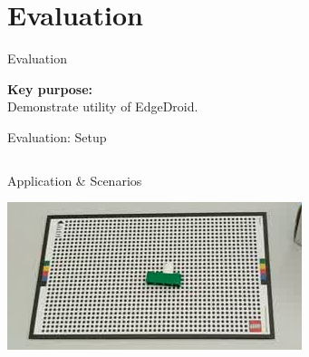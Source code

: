 \documentclass[aspectratio=1610, notes]{beamer}
\begin{document}
\section{Evaluation}
\begin{frame}{Evaluation}
    \begin{center}
        \Large%
        \textbf{Key purpose:}\\
        Demonstrate utility of EdgeDroid.\\
    \end{center}
\end{frame}

\begin{frame}{Evaluation: Setup}
    \begin{columns}[onlytextwidth]
        \begin{column}{.5\linewidth}
            \begin{block}{Application \& Scenarios}
                \begin{center}
                    \includegraphics[width=.7\linewidth]{img/lego/img3.jpeg}


\end{center}
\end{block}
\end{column}
\end{columns}
\end{frame}
\end{document}
